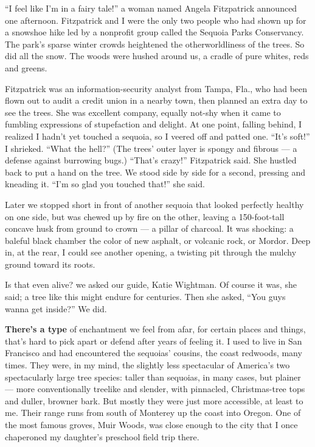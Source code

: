 ``I feel like I'm in a fairy tale!'' a woman named Angela Fitzpatrick
announced one afternoon. Fitzpatrick and I were the only two people who
had shown up for a snowshoe hike led by a nonprofit group called the
Sequoia Parks Conservancy. The park's sparse winter crowds heightened
the otherworldliness of the trees. So did all the snow. The woods were
hushed around us, a cradle of pure whites, reds and greens.

Fitzpatrick was an information-security analyst from Tampa, Fla., who
had been flown out to audit a credit union in a nearby town, then
planned an extra day to see the trees. She was excellent company,
equally not-shy when it came to fumbling expressions of stupefaction and
delight. At one point, falling behind, I realized I hadn't yet touched a
sequoia, so I veered off and patted one. ``It's soft!'' I shrieked.
``What the hell?'' (The trees' outer layer is spongy and fibrous --- a
defense against burrowing bugs.) ``That's crazy!'' Fitzpatrick said. She
hustled back to put a hand on the tree. We stood side by side for a
second, pressing and kneading it. ``I'm so glad you touched that!'' she
said.

Later we stopped short in front of another sequoia that looked perfectly
healthy on one side, but was chewed up by fire on the other, leaving a
150-foot-tall concave husk from ground to crown --- a pillar of
charcoal. It was shocking: a baleful black chamber the color of new
asphalt, or volcanic rock, or Mordor. Deep in, at the rear, I could see
another opening, a twisting pit through the mulchy ground toward its
roots.

Is that even alive? we asked our guide, Katie Wightman. Of course it
was, she said; a tree like this might endure for centuries. Then she
asked, ``You guys wanna get inside?'' We did.

\textbf{There's a type} of enchantment we feel from afar, for certain
places and things, that's hard to pick apart or defend after years of
feeling it. I used to live in San Francisco and had encountered the
sequoias' cousins, the coast redwoods, many times. They were, in my
mind, the slightly less spectacular of America's two spectacularly large
tree species: taller than sequoias, in many cases, but plainer --- more
conventionally treelike and slender, with pinnacled, Christmas-tree tops
and duller, browner bark. But mostly they were just more accessible, at
least to me. Their range runs from south of Monterey up the coast into
Oregon. One of the most famous groves, Muir Woods, was close enough to
the city that I once chaperoned my daughter's preschool field trip
there.


